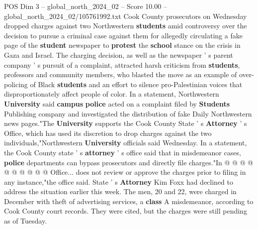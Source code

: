 \begin{textsample}{POS Dim 3 – global\_north\_2024\_02 – Score 10.00 – global\_north\_2024\_02/105761992.txt}  \label{ex:f3_pos_258}
Cook County prosecutors on Wednesday dropped charges against two Northwestern \textbf{students} amid controversy over the decision to pursue a criminal case against them for allegedly circulating a fake page of the \textbf{student} newspaper to \textbf{protest} the \textbf{school} stance on the crisis in Gaza and Israel.
The charging decision, as well as the newspaper ' s parent company ' s pursuit of a complaint, attracted harsh criticism from \textbf{students}, professors and community members, who blasted the move as an example of over-policing of Black \textbf{students} and an effort to silence pro-Palestinian voices that disproportionately affect people of color.
In a statement, Northwestern \textbf{University} said \textbf{campus} \textbf{police} acted on a complaint filed by \textbf{Students} Publishing company and investigated the distribution of fake Daily Northwestern news pages."The \textbf{University} supports the Cook County State ' s \textbf{Attorney} ' s Office, which has used its discretion to drop charges against the two individuals,"Northwestern \textbf{University} officials said Wednesday.
In a statement, the Cook County state ' s \textbf{attorney} ' s office said that in misdemeanor cases, \textbf{police} departments can bypass prosecutors and directly file charges."In @ @ @ @ @ @ @ @ @ @ Office... does not review or approve the charges prior to filing in any instance,"the office said.
State ' s \textbf{Attorney} Kim Foxx had declined to address the situation earlier this week.
The men, 20 and 22, were charged in December with theft of advertising services, a \textbf{class} A misdemeanor, according to Cook County court records.
They were cited, but the charges were still pending as of Tuesday.

\end{textsample}
